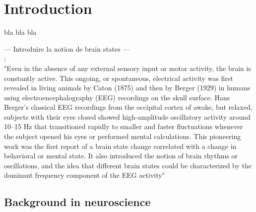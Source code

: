\chapter{Introduction}
\begin{blueshaded}
bla bla bla
\end{blueshaded}

%
%

\color{gray}
--- Introduire la notion de brain states ---\\
\citep{poulet_cortical_2019}:\\
"Even in the absence of any external sensory input or motor activity, the brain is constantly active. This ongoing, or spontaneous, electrical activity was first revealed in living animals by Caton (1875) and then by Berger (1929) in humans using electroencephalography (EEG) recordings on the skull surface. Hans Berger’s classical EEG recordings from the occipital cortex of awake, but relaxed, subjects with their eyes closed showed high-amplitude oscillatory activity around 10–15 Hz that transitioned rapidly to smaller and faster fluctuations whenever the subject opened his eyes or performed mental calculations. This pioneering work was the first report of a brain state change correlated with a change in behavioral or mental state. It also introduced the notion of brain rhythms or oscillations, and the idea that different brain states could be characterized by the dominant frequency component of the EEG activity"
\color{black}




\newpage
%
%
\section{Background in neuroscience}



